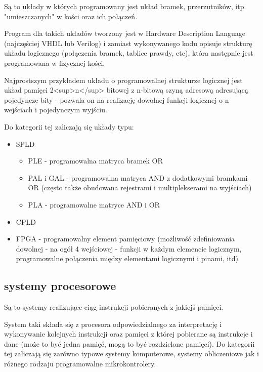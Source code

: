 \documentclass{pdfBooklets}
\begin{document}
Są to układy w których programowany jest układ bramek, przerzutników, itp. "umieszczanych" w kości oraz ich połączeń.

Program dla takich układów tworzony jest w Hardware Description Language (najczęściej VHDL lub Verilog) i zamiast wykonywanego kodu opisuje strukturę układu logicznego (połączenia bramek, tablice prawdy, etc), która następnie jest programowana w fizycznej kości.

Najprostszym przykładem układu o programowalnej strukturze logicznej jest układ pamięci 2<sup>n</sup> bitowej z n-bitową szyną adresową adresującą pojedyncze bity - pozwala on na realizację dowolnej funkcji logicznej o n wejściach i pojedynczym wyjściu.

Do kategorii tej zaliczają się układy typu:
\begin{itemize}
	\item SPLD
	\begin{itemize}
		\item PLE - programowalna matryca bramek OR
		\item PAL i GAL - programowalna matryca AND z dodatkowymi bramkami OR (często także obudowana rejestrami i multiplekserami na wyjściach)
		\item PLA - programowalne matryce AND i OR
	\end{itemize}
	\item CPLD
	\item FPGA - programowalny element pamięciowy (możliwość zdefiniowania dowolnej - na ogół 4 wejściowej - funkcji w każdym elemencie logicznym, programowalne połączenia między elementami logicznymi i pinami, itd)
\end{itemize}

\subsection{systemy procesorowe}
Są to systemy realizujące ciąg instrukcji pobieranych z jakiejś pamięci.

System taki składa się z procesora odpowiedzialnego za interpretację i wykonywanie kolejnych instrukcji oraz pamięci z której pobierane są instrukcje i dane (może to być jedna pamięć, mogą to być rozdzielone pamięci). Do kategorii tej zaliczają się zarówno typowe systemy komputerowe, systemy obliczeniowe jak i różnego rodzaju programowalne mikrokontrolery.
\end{document}
